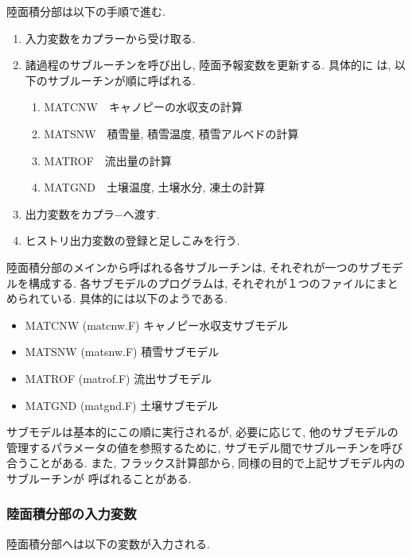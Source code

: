 陸面積分部は以下の手順で進む.
\begin{enumerate}
 \item 入力変数をカプラーから受け取る.
 \item 諸過程のサブルーチンを呼び出し, 陸面予報変数を更新する. 具体的に
       は, 以下のサブルーチンが順に呼ばれる.
   \begin{enumerate}
    \item MATCNW\ \ キャノピーの水収支の計算
    \item MATSNW\ \ 積雪量, 積雪温度, 積雪アルベドの計算
    \item MATROF\ \ 流出量の計算
    \item MATGND\ \ 土壌温度, 土壌水分, 凍土の計算
   \end{enumerate}
 \item 出力変数をカプラ−へ渡す.
 \item ヒストリ出力変数の登録と足しこみを行う.
\end{enumerate}

陸面積分部のメインから呼ばれる各サブルーチンは, それぞれが一つのサブモデ
ルを構成する. 各サブモデルのプログラムは, それぞれが１つのファイルにまと
められている. 具体的には以下のようである.

\begin{itemize}
 \item MATCNW (matcnw.F) キャノピー水収支サブモデル
 \item MATSNW (matsnw.F) 積雪サブモデル
 \item MATROF (matrof.F) 流出サブモデル
 \item MATGND (matgnd.F) 土壌サブモデル
\end{itemize}

サブモデルは基本的にこの順に実行されるが, 必要に応じて, 他のサブモデルの
管理するパラメータの値を参照するために, サブモデル間でサブルーチンを呼び
合うことがある.
また, フラックス計算部から, 同様の目的で上記サブモデル内のサブルーチンが
呼ばれることがある.

\subsubsection{陸面積分部の入力変数}

陸面積分部へは以下の変数が入力される.

